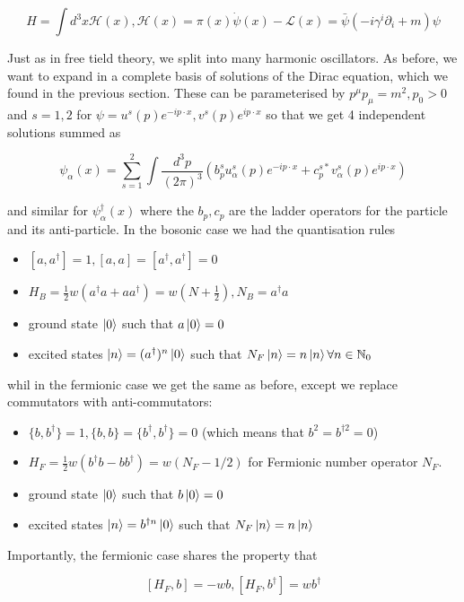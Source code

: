 \documentclass{article}
\theoremstyle{definition}
\begin{document}
$$ H = \int d^3x \mathcal{H}(x), \mathcal{H}(x) = \pi(x) \dot{\psi}(x) -
\mathcal{L}(x) = \bar{\psi}(- i \gamma^i \partial_i + m) \psi $$

Just as in free tield theory, we split into many harmonic oscillators. As
before, we want to expand in a complete basis of solutions of the Dirac
equation, which we found in the previous section. These can be parameterised by
$p^\mu p_\mu = m^2, p_0 > 0$ and $s = 1,2$ for $\psi = u^s(p) e^{-ip \cdot x},
v^s(p) e^{i p \cdot x}$ so that we get 4 independent solutions summed as

$$ \psi_\alpha(x) = \sum_{s = 1}^2 \int \frac{d^3p}{(2\pi)^3} \left( b^s_p
  u^s_\alpha(p) e^{-ip \cdot x} + c^{s*}_p v^s_\alpha(p) e^{ip \cdot x}
\right) $$

and similar for $\psi_\alpha^\dagger(x)$ where the $b_p, c_p$ are the ladder
operators for the particle and its anti-particle. In the bosonic case we had the
quantisation rules

\begin{itemize}
\item $[a, a^\dagger] = 1, [a, a] = [a^\dagger, a^\dagger] = 0$
\item $H_B = \frac{1}{2} w (a^\dagger a + a a^\dagger) = w(N + \frac{1}{2}), N_B
  = a^\dagger a$
\item ground state $\ket{0}$ such that $a\ket{0} = 0$
\item excited states $\ket{n} = (a^\dagger)^n \ket{0}$ such that $N_F \ket{n} =
  n \ket{n} \forall n \in \mathbb{N}_0$ 
\end{itemize}

whil in the fermionic case we get the same as before, except we replace
commutators with anti-commutators:

\begin{itemize}
\item $\{b, b^\dagger\} = 1, \{b, b\} = \{b^\dagger, b^\dagger\} = 0$ (which
  means that $b^2 = b^{\dagger 2} = 0$)
\item $H_F = \frac{1}{2} w (b^\dagger b - bb^\dagger) = w(N_F - 1/2)$ for
  Fermionic number operator $N_F$.
\item ground state $\ket{0}$ such that $b \ket{0} = 0$
\item excited states $\ket{n} = b^{\dagger n} \ket{0}$ such that $N_F \ket{n} =
  n\ket{n}$
\end{itemize}

Importantly, the fermionic case shares the property that

$$ [H_F, b] = -wb, [H_F, b^\dagger] = wb^\dagger $$
\end{document}
